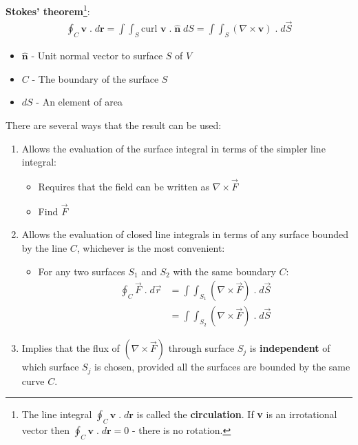 \documentclass[10pt,a4paper]{article}
\begin{document}
\begin{tcolorbox}[breakable,colback=white]
\textbf{Stokes' theorem}\footnote{The line integral $\oint_C \textbf{v}\;.\;d\textbf{r}$ is called the \textbf{circulation}. If
\textbf{v} is an irrotational vector then $\oint_C \textbf{v}\;.\;d\textbf{r}=0$ - there is no
rotation.}: 
\begin{align*}
    \oint_C \textbf{v}\;.\;d\textbf{r} = \int\int_S\text{curl }\textbf{v}\;.\;\hat{\textbf{n}}\; dS = \int\int_S(\nabla \times \textbf{v})\;.\;d\overrightarrow{S}
\end{align*}
\begin{itemize}
    \item $\hat{\textbf{n}}$ - Unit normal vector to surface $S$ of $V$
    \item $C$ - The boundary of the surface $S$ 
    \item $dS$ - An element of area
\end{itemize}
\end{tcolorbox}

There are several ways that the result can be used:
\begin{enumerate}
    \item Allows the evaluation of the surface integral in terms of the simpler line integral:
    \begin{itemize}
        \item Requires that the field can be written as $\nabla \times \overrightarrow{F}$
        \item Find $\overrightarrow{F}$
    \end{itemize}

    \item Allows the evaluation of closed line integrals in terms of any surface bounded by the line
    $C$, whichever is the most convenient:
    \begin{itemize}
        \item For any two surfaces $S_1$ and $S_2$ with the same boundary $C$:
        \begin{align*}
            \oint_C \overrightarrow{F}\;.\;d\overrightarrow{r} &= \int\int_{S_1}\left(\nabla\times \overrightarrow{F}\right)\;.\;d\overrightarrow{S} \\
            &= \int \int_{S_2} \left(\nabla \times \overrightarrow{F}\right)\;.\;d\overrightarrow{S}
        \end{align*}
    \end{itemize}
    \item Implies that the flux of $\left(\nabla \times \overrightarrow{F}\right)$ through surface
    $S_j$ is \textbf{independent} of which surface $S_j$ is chosen, provided all the surfaces are
    bounded by the same curve $C$.
\end{enumerate}
\end{document}
